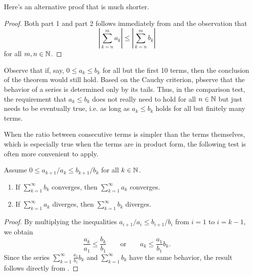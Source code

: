 Here's an alternative proof that is much shorter.

\begin{proof}
  Both part 1 and part 2 follows immediately from
   and the observation that
  \[ \left|\sum_{k = n}^{m} a_k\right| \leq \left|\sum_{k = n}^{m}
  b_k\right| \]
  for all $m, n \in \mathbb N$.
\end{proof}

\begin{remark}
  Observe that if, say, $0 \leq a_k \leq b_k$ for all but the first
  10 terms, then the conclusion of the theorem would still hold.
  Based on the Cauchy criterion, pbserve that the behavior of a series is
  determined only by its tails. Thus, in the comparison test, the
  requirement that $a_k \leq b_k$ does not really need to hold for
  all $n \in \mathbb N$ but just needs to be eventually true, i.e. as long
  as $a_k \leq b_k$ holds for all but finitely many terms.
\end{remark}

\begin{remark}
  When the ratio between consecutive terms is simpler than the terms
  themselves, which
  is especially true when the terms are in product form, the
  following test is often more
  convenient to apply.
\end{remark}

\begin{proposition}
  Assume $0 \leq a_{k + 1}/a_k \leq b_{k + 1}/b_k$ for all $k \in \mathbb N$.
  \begin{enumerate}
    \item If $\sum_{k = 1}^{\infty} b_k$ converges, then $\sum_{k =
      1}^{\infty} a_k$ converges.
    \item If $\sum_{k = 1}^{\infty} a_k$ diverges, then $\sum_{k =
      1}^{\infty} b_k$ diverges.
  \end{enumerate}
\end{proposition}

\begin{proof}
  By multiplying the inequalities $a_{i + 1}/a_i \leq b_{i + 1}/b_i$
  from $i = 1$ to $i = k - 1$, we obtain
  \[ \frac{a_k}{a_1} \leq \frac{b_k}{b_1} \qquad \text{or} \qquad
  a_k \leq \frac{a_1}{b_1} b_k. \]
  Since the series $\sum_{k = 1}^{\infty} \frac{a_1}{b_1} b_k$ and
  $\sum_{k = 1}^{\infty} b_k$ have the same behavior, the result
  follows directly from .
\end{proof}

